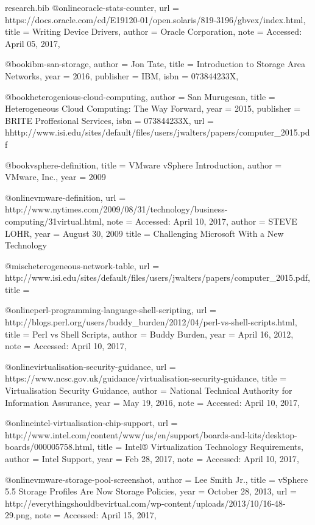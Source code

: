 \documentclass{article}
\begin{document}
\begin{filecontents*}{research.bib}
    @online{oracle-stats-counter,
        url = {https://docs.oracle.com/cd/E19120-01/open.solaris/819-3196/gbvex/index.html},
        title = {Writing Device Drivers},
        author = {Oracle Corporation},
        note = {Accessed: April 05, 2017},
    }

    @book{ibm-san-storage,
        author    = {Jon Tate},
        title     = {Introduction to Storage Area Networks},
        year      = {2016},
        publisher = {IBM},
        isbn      =  {073844233X},
    }

    @book{heterogenious-cloud-computing,
        author    = {San Murugesan},
        title     = {Heterogeneous Cloud Computing: The Way Forward},
        year      = {2015},
        publisher = {BRITE Proffesional Services},
        isbn      =  {073844233X},
        url = {hhttp://www.isi.edu/sites/default/files/users/jwalters/papers/computer_2015.pdf}
    }

    @book{vsphere-definition,
        title = {VMware vSphere Introduction},
        author = {VMware, Inc.},
        year = {2009}
    }

    @online{vmware-definition,
        url = {http://www.nytimes.com/2009/08/31/technology/business-computing/31virtual.html},
        note = {Accessed: April 10, 2017},
        author = {STEVE LOHR},
        year = {August 30, 2009}
        title = {Challenging Microsoft With a New Technology}
    }

    @misc{heterogeneous-network-table,
        url = {http://www.isi.edu/sites/default/files/users/jwalters/papers/computer_2015.pdf},
        title = {}
    }

    @online{perl-programming-language-shell-scripting,
        url = {http://blogs.perl.org/users/buddy_burden/2012/04/perl-vs-shell-scripts.html},
        title = {Perl vs Shell Scripts},
        author = {Buddy Burden},
        year = {April 16, 2012},
        note = {Accessed: April 10, 2017},
    }

	@online{virtualisation-security-guidance,
	    url = {https://www.ncsc.gov.uk/guidance/virtualisation-security-guidance},
		title = {Virtualisation Security Guidance},
		author = {National Technical Authority for Information Assurance},
		year = {May 19, 2016},
		note = {Accessed: April 10, 2017},
	}

	@online{intel-virtualisation-chip-support,
		url = {http://www.intel.com/content/www/us/en/support/boards-and-kits/desktop-boards/000005758.html},
		title = { Intel® Virtualization Technology Requirements},
		author = {Intel Support},
		year = {Feb 28, 2017},
		note = {Accessed: April 10, 2017},
	}

	@online{vmware-storage-pool-screenshot,
		author  = {Lee Smith Jr.},
		title   = {vSphere 5.5 Storage Profiles Are Now Storage Policies},
		year    = {October 28, 2013},
		url     = {http://everythingshouldbevirtual.com/wp-content/uploads/2013/10/16-48-29.png},
		note = {Accessed: April 15, 2017},
	}

\end{filecontents*}


\end{document}
